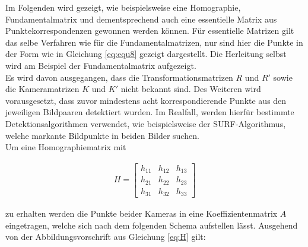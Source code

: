 Im Folgenden wird gezeigt, wie beispielsweise eine Homographie, Fundamentalmatrix und dementsprechend auch eine essentielle Matrix aus Punktekorrespondenzen gewonnen werden können. Für essentielle Matrizen gilt das selbe Verfahren wie für die Fundamentalmatrizen, nur sind hier die Punkte in der Form wie in Gleichung \ref{eq:equ8} gezeigt dargestellt. Die Herleitung selbst wird am Beispiel der Fundamentalmatrix aufgezeigt.\\

Es wird davon ausgegangen, dass die Transformationsmatrizen $R$ und $R'$ sowie die Kameramatrizen $K$ und $K'$ nicht bekannt sind. Des Weiteren wird vorausgesetzt, dass zuvor mindestens acht korrespondierende Punkte aus den jeweiligen Bildpaaren detektiert wurden. Im Realfall, werden hierfür bestimmte Detektionsalgorithmen verwendet, wie beispielsweise der SURF-Algorithmus\cite{SURF}, welche markante Bildpunkte in beiden Bilder suchen.\\


Um eine Homographiematrix mit 

\begin{gather}
	H=
	\begin{bmatrix}
		h_{11}&h_{12}&h_{13}\\
		h_{21}&h_{22}&h_{23}\\
		h_{31}&h_{32}&h_{33}
	\end{bmatrix}
\end{gather}

zu erhalten werden die Punkte beider Kameras in eine Koeffizientenmatrix $A$ eingetragen, welche sich nach dem folgenden Schema aufstellen lässt\cite{HZ,Elements}. Ausgehend von der Abbildungsvorschrift aus Gleichung \ref{eq:H} gilt:

